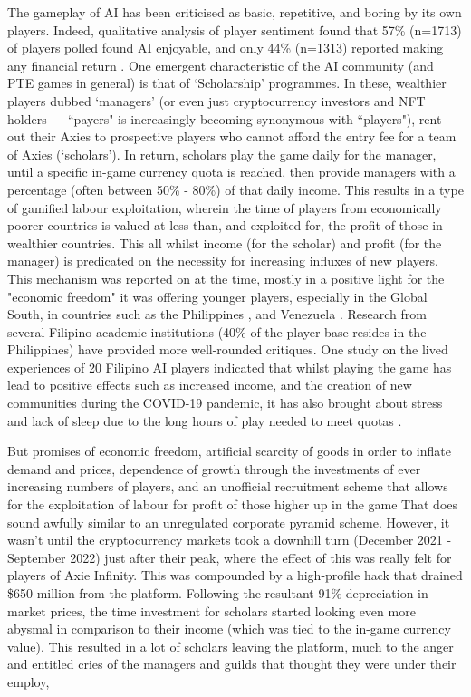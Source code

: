 The gameplay of AI has been criticised as basic, repetitive, and boring by its own players. Indeed, qualitative analysis of player sentiment found that 57\% (n=1713) of players polled found AI enjoyable, and only 44\% (n=1313) reported making any financial return \citep[]{delic2022}. One emergent characteristic of the AI community (and PTE games in general) is that of `Scholarship' programmes. In these, wealthier players dubbed `managers' (or even just cryptocurrency investors and NFT holders — ``payers" is increasingly becoming synonymous with ``players"), rent out their Axies to prospective players who cannot afford the entry fee for a team of Axies (`scholars'). In return, scholars play the game daily for the manager, until a specific in-game currency quota is reached, then provide managers with a percentage (often between 50\% - 80\%) of that daily income. This results in a type of gamified labour exploitation, wherein the time of players from economically poorer countries is valued at less than, and exploited for, the profit of those in wealthier countries. This all whilst income (for the scholar) and profit (for the manager) is predicated on the necessity for increasing influxes of new players. This mechanism was reported on at the time, mostly in a positive light for the "economic freedom" it was offering younger players, especially in the Global South, in countries such as the Philippines \citep[]{puyat2021}, and Venezuela \citep[]{ledesma2021}. Research from several Filipino academic institutions (40\% of the player-base resides in the Philippines) have provided more well-rounded critiques. One study on the lived experiences of 20 Filipino AI players indicated that whilst playing the game has lead to positive effects such as increased income, and the creation of new communities during the COVID-19 pandemic, it has also brought about stress and lack of sleep due to the long hours of play needed to meet quotas \citep[]{dejesus2022}.

But promises of economic freedom, artificial scarcity of goods in order to inflate demand and prices, dependence of growth through the investments of ever increasing numbers of players, and an unofficial recruitment scheme that allows for the exploitation of labour for profit of those higher up in the game\textinterrobang\xspace That does sound awfully similar to an unregulated corporate pyramid scheme. However, it wasn't until the cryptocurrency markets took a downhill turn (December 2021 - September 2022) just after their peak, where the effect of this was really felt for players of Axie Infinity. This was compounded by a high-profile hack that drained \$650 million from the platform. Following the resultant 91\% depreciation in market prices, the time investment for scholars started looking even more abysmal in comparison to their income (which was tied to the in-game currency value). This resulted in a lot of scholars leaving the platform, much to the anger and entitled cries of the managers and guilds that thought they were under their employ, \citep[]{ongwesojr.2022,gach2022}

